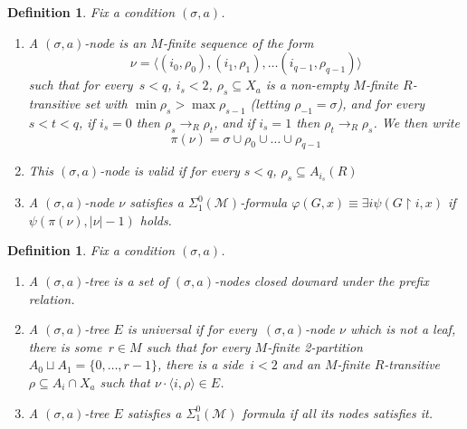 \documentclass{article}
\numberwithin{theorem}{section}
\newtheorem{lemma}[theorem]{Lemma}
\newtheorem{definition}[theorem]{Definition}
\newcommand{\RCA}{\mathsf{RCA}}
\newcommand{\M}{\mathcal{M}}
\newcommand{\uh}[0]{{\upharpoonright}}
\newcommand{\ntimes}{\dottimes}
\begin{document}

\begin{definition}
Fix a condition $(\sigma, a)$.
\begin{enumerate}
    \item[(1)] A \emph{$(\sigma, a)$-node} is an $M$-finite sequence of the form
$$\nu = \langle (i_0, \rho_0), (i_1, \rho_1), \dots (i_{q-1}, \rho_{q-1}) \rangle$$ such that for every~$s < q$, $i_s < 2$, $\rho_s \subseteq X_a$ is a non-empty $M$-finite $R$-transitive set with $\min \rho_s > \max \rho_{s-1}$ (letting $\rho_{-1} = \sigma$), and for every~$s < t < q$, if $i_s = 0$ then $\rho_s \to_R \rho_t$, and if $i_s = 1$ then $\rho_t \to_R \rho_s$.
We then write $$\pi(\nu) = \sigma \cup \rho_0 \cup \dots \cup \rho_{q-1}$$
    \item[(2)] This $(\sigma, a)$-node is \emph{valid} if for every $s < q$, $\rho_s \subseteq A_{i_s}(R)$
    \item[(3)] A $(\sigma, a)$-node $\nu$ \emph{satisfies} a $\Sigma^0_1(\M)$-formula $\varphi(G, x) \equiv \exists i \psi(G \uh i, x)$  if $\psi(\pi(\nu), |\nu|-1)$ holds.
\end{enumerate}
\end{definition}

\begin{definition}
Fix a condition $(\sigma, a)$.
\begin{enumerate}
    \item[(1)] A \emph{$(\sigma, a)$-tree} is a set of $(\sigma, a)$-nodes closed downard under the prefix relation.
    \item[(2)] A $(\sigma, a)$-tree $E$ is \emph{universal} if for every~$(\sigma,a)$-node $\nu$
    which is not a leaf, there is some~$r \in M$ such that for every $M$-finite 2-partition $A_0 \sqcup A_1 = \{0, \dots, r-1\}$, there is a side~$i < 2$ and an $M$-finite $R$-transitive $\rho \subseteq A_i \cap X_a$ such that $\nu \cdot \langle i, \rho \rangle \in E$.
    \item[(3)] A $(\sigma, a)$-tree $E$ satisfies a $\Sigma^0_1(\M)$ formula if all its nodes satisfies it.
\end{enumerate}
\end{definition}
\end{document}
